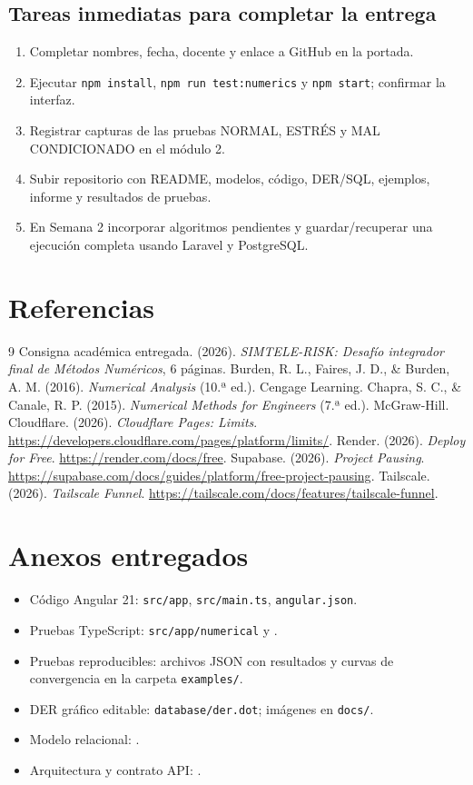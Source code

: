 \documentclass[letterpaper,11pt]{article}
\begin{document}
\subsection*{Tareas inmediatas para completar la entrega}
\begin{enumerate}
\item Completar nombres, fecha, docente y enlace a GitHub en la portada.
\item Ejecutar \texttt{npm install}, \texttt{npm run test:numerics} y \texttt{npm start}; confirmar la interfaz.
\item Registrar capturas de las pruebas NORMAL, ESTRÉS y MAL CONDICIONADO en el módulo 2.
\item Subir repositorio con README, modelos, código, DER/SQL, ejemplos, informe y resultados de pruebas.
\item En Semana 2 incorporar algoritmos pendientes y guardar/recuperar una ejecución completa usando Laravel y PostgreSQL.
\end{enumerate}

\section{Referencias}
\begin{thebibliography}{9}
 Consigna académica entregada. (2026). \emph{SIMTELE-RISK: Desafío integrador final de Métodos Numéricos}, 6 páginas.
 Burden, R. L., Faires, J. D., \& Burden, A. M. (2016). \emph{Numerical Analysis} (10.ª ed.). Cengage Learning.
 Chapra, S. C., \& Canale, R. P. (2015). \emph{Numerical Methods for Engineers} (7.ª ed.). McGraw-Hill.
 Cloudflare. (2026). \emph{Cloudflare Pages: Limits}. \url{https://developers.cloudflare.com/pages/platform/limits/}.
 Render. (2026). \emph{Deploy for Free}. \url{https://render.com/docs/free}.
 Supabase. (2026). \emph{Project Pausing}. \url{https://supabase.com/docs/guides/platform/free-project-pausing}.
 Tailscale. (2026). \emph{Tailscale Funnel}. \url{https://tailscale.com/docs/features/tailscale-funnel}.
\end{thebibliography}

\section*{Anexos entregados}
\begin{itemize}
\item Código Angular 21: \texttt{src/app}, \texttt{src/main.ts}, \texttt{angular.json}.
\item Pruebas TypeScript: \texttt{src/app/numerical} y .
\item Pruebas reproducibles: archivos JSON con resultados y curvas de convergencia en la carpeta \texttt{examples/}.
\item DER gráfico editable: \texttt{database/der.dot}; imágenes en \texttt{docs/}.
\item Modelo relacional: .
\item Arquitectura y contrato API: .
\end{itemize}
\end{document}
